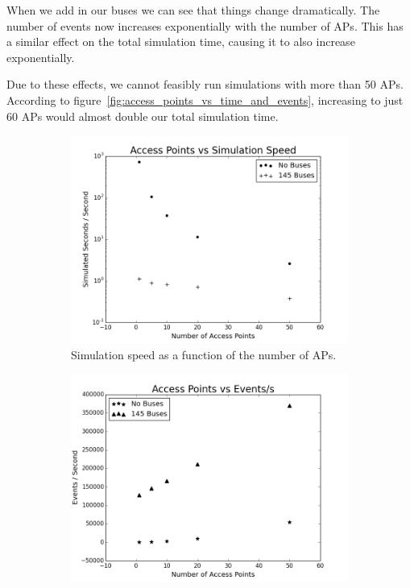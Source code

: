         When we add in our buses we can see that things change dramatically. The number of events now increases exponentially with the number of APs. This has a similar effect on the total simulation time, causing it to also increase exponentially. 

        Due to these effects, we cannot feasibly run simulations with more than 50 APs. According to figure~\ref{fig:access_points_vs_time_and_events}, increasing to just 60 APs would almost double our total simulation time. 

        \begin{figure}
            \centering
            \begin{subfigure}{0.45\textwidth}
                \centering
                \includegraphics[width=\linewidth]{./images/AP_vs_Simulation_Speed.png}
                \caption{Simulation speed as a function of the number of APs.}
                \label{fig:access_points_speed}
            \end{subfigure}%
            \begin{subfigure}{0.45\textwidth}
                \includegraphics[width=\linewidth]{./images/AP_vs_Events.png}

\end{subfigure}
\end{figure}
